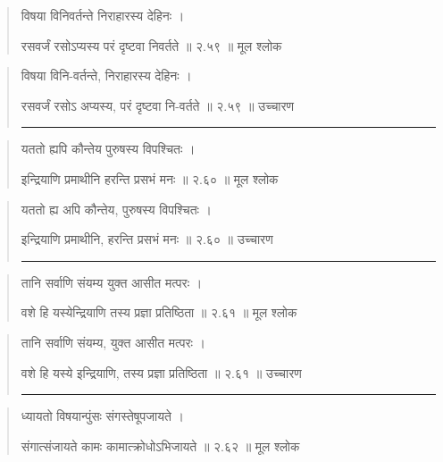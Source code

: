 \begin{quotation}

विषया विनिवर्तन्ते निराहारस्य देहिनः  ।  

रसवर्जं रसोऽप्यस्य परं दृष्टवा निवर्तते  ॥ २.५९ ॥  मूल श्लोक
\end{quotation}

\begin{quotation}

विषया विनि-वर्तन्ते, निराहारस्य देहिनः  ।  

रसवर्जं रसोऽ अप्यस्य, परं दृष्टवा नि-वर्तते  ॥ २.५९ ॥  उच्चारण

\noindent\rule{16cm}{0.4pt} 
\end{quotation}


\begin{quotation}

यततो ह्यपि कौन्तेय पुरुषस्य विपश्चितः  ।  

इन्द्रियाणि प्रमाथीनि हरन्ति प्रसभं मनः  ॥ २.६० ॥  मूल श्लोक
\end{quotation}

\begin{quotation}

यततो ह्य अपि कौन्तेय, पुरुषस्य विपश्चितः  ।  

इन्द्रियाणि प्रमाथीनि, हरन्ति प्रसभं मनः  ॥ २.६० ॥  उच्चारण

\noindent\rule{16cm}{0.4pt} 
\end{quotation}


\begin{quotation}

तानि सर्वाणि संयम्य युक्त आसीत मत्परः  ।  

वशे हि यस्येन्द्रियाणि तस्य प्रज्ञा प्रतिष्ठिता  ॥ २.६१ ॥  मूल श्लोक
\end{quotation}

\begin{quotation}

तानि सर्वाणि संयम्य, युक्त आसीत मत्परः  ।  

वशे हि यस्ये इन्द्रियाणि, तस्य प्रज्ञा प्रतिष्ठिता  ॥ २.६१ ॥  उच्चारण

\noindent\rule{16cm}{0.4pt} 
\end{quotation}


\begin{quotation}

ध्यायतो विषयान्पुंसः संगस्तेषूपजायते  ।  

संगात्संजायते कामः कामात्क्रोधोऽभिजायते  ॥ २.६२ ॥  मूल श्लोक
\end{quotation}

